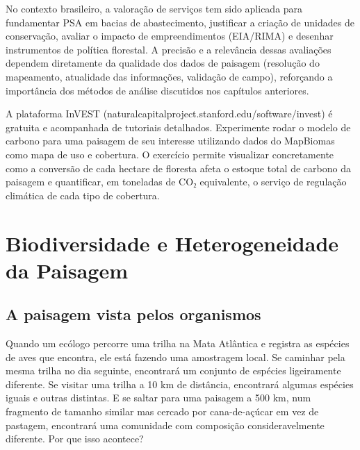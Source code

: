 \documentclass[
  portuguese,
  11pt,
  a4paper,
  open=any]{scrbook}
\begin{document}
No contexto brasileiro, a valoração de serviços tem sido aplicada para
fundamentar PSA em bacias de abastecimento, justificar a criação de
unidades de conservação, avaliar o impacto de empreendimentos (EIA/RIMA)
e desenhar instrumentos de política florestal. A precisão e a relevância
dessas avaliações dependem diretamente da qualidade dos dados de
paisagem (resolução do mapeamento, atualidade das informações, validação
de campo), reforçando a importância dos métodos de análise discutidos
nos capítulos anteriores.

\begin{tcolorbox}[enhanced jigsaw, colbacktitle=quarto-callout-tip-color!10!white, coltitle=black, opacityback=0, breakable, left=2mm, colback=white, bottomtitle=1mm, toptitle=1mm, titlerule=0mm, arc=.35mm, opacitybacktitle=0.6, leftrule=.75mm, colframe=quarto-callout-tip-color-frame, title=\textcolor{quarto-callout-tip-color}{\faLightbulb}\hspace{0.5em}{Para aprofundar}, rightrule=.15mm, bottomrule=.15mm, toprule=.15mm]

A plataforma InVEST (naturalcapitalproject.stanford.edu/software/invest)
é gratuita e acompanhada de tutoriais detalhados. Experimente rodar o
modelo de carbono para uma paisagem de seu interesse utilizando dados do
MapBiomas como mapa de uso e cobertura. O exercício permite visualizar
concretamente como a conversão de cada hectare de floresta afeta o
estoque total de carbono da paisagem e quantificar, em toneladas de CO₂
equivalente, o serviço de regulação climática de cada tipo de cobertura.

\end{tcolorbox}

\chapter{Biodiversidade e Heterogeneidade da
Paisagem}\label{sec-biodiversidade}

\section{A paisagem vista pelos
organismos}\label{a-paisagem-vista-pelos-organismos}

Quando um ecólogo percorre uma trilha na Mata Atlântica e registra as
espécies de aves que encontra, ele está fazendo uma amostragem local. Se
caminhar pela mesma trilha no dia seguinte, encontrará um conjunto de
espécies ligeiramente diferente. Se visitar uma trilha a 10 km de
distância, encontrará algumas espécies iguais e outras distintas. E se
saltar para uma paisagem a 500 km, num fragmento de tamanho similar mas
cercado por cana-de-açúcar em vez de pastagem, encontrará uma comunidade
com composição consideravelmente diferente. Por que isso acontece?
\end{document}
